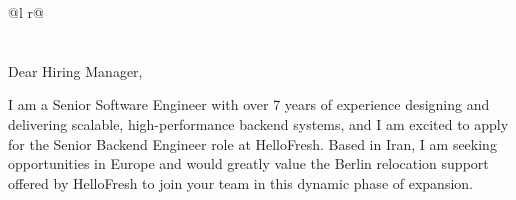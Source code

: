 \documentclass[a5paper,12pt]{article}
\begin{document}
\begin{tabularx}{\linewidth}{ @{}l r@{} }
\end{tabularx}

\vspace{-1cm}
\section{\large{}}




Dear Hiring Manager,

I am a Senior Software Engineer with over 7 years of experience designing and delivering scalable, high-performance backend systems, and I am excited to apply for the Senior Backend Engineer role at HelloFresh. Based in Iran, I am seeking opportunities in Europe and would greatly value the Berlin relocation support offered by HelloFresh to join your team in this dynamic phase of expansion.
\end{document}
